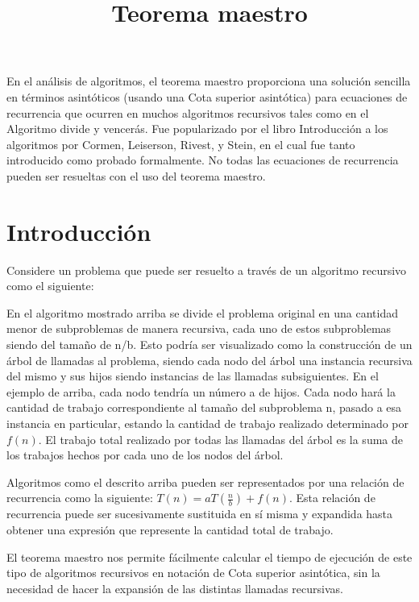 \documentclass[12pt]{article} %
\title{Teorema maestro}
\date{}
\begin{document}
\maketitle
En el análisis de algoritmos, el teorema maestro proporciona una solución sencilla en términos asintóticos (usando una Cota superior asintótica) para ecuaciones de recurrencia que ocurren en muchos algoritmos recursivos tales como en el Algoritmo divide y vencerás. Fue popularizado por el libro Introducción a los algoritmos por Cormen, Leiserson, Rivest, y Stein, en el cual fue tanto introducido como probado formalmente. No todas las ecuaciones de recurrencia pueden ser resueltas con el uso del teorema maestro.



\tableofcontents
\section{Introducción}
Considere un problema que puede ser resuelto a través de un algoritmo recursivo como el siguiente:

En el algoritmo mostrado arriba se divide el problema original en una cantidad menor de subproblemas de manera recursiva, cada uno de estos subproblemas siendo del tamaño de n/b. Esto podría ser visualizado como la construcción de un árbol de llamadas al problema, siendo cada nodo del árbol una instancia recursiva del mismo y sus hijos siendo instancias de las llamadas subsiguientes. En el ejemplo de arriba, cada nodo tendría un número a de hijos. Cada nodo hará la cantidad de trabajo correspondiente al tamaño del subproblema n, pasado a esa instancia en particular, estando la cantidad de trabajo realizado determinado por $f(n)$. El trabajo total realizado por todas las llamadas del árbol es la suma de los trabajos hechos por cada uno de los nodos del árbol.

Algoritmos como el descrito arriba pueden ser representados por una relación de recurrencia como la siguiente: $T(n) = aT (\frac{n}{b}) + f(n)$. 
Esta relación de recurrencia puede ser sucesivamente sustituida en sí misma y expandida hasta obtener una expresión que represente la cantidad total de trabajo. \textcite{DukeUniversity}

El teorema maestro nos permite fácilmente calcular el tiempo de ejecución de este tipo de algoritmos recursivos en notación de Cota superior asintótica, sin la necesidad de hacer la expansión de las distintas llamadas recursivas.
\end{document}
